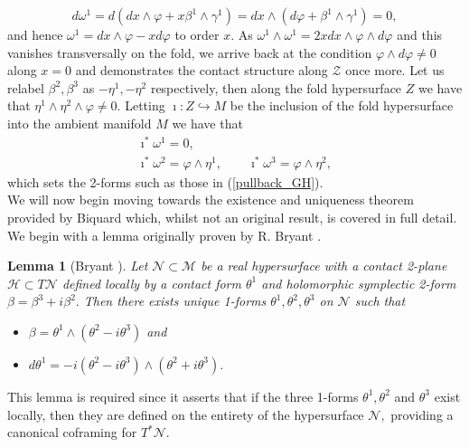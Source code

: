 \documentclass[a4paper,12pt, onecolumn, notitlepage]{article}
\newtheorem{lem}[thm]{Lemma}
\theoremstyle{definition}
\theoremstyle{remark}
\newcommand{\w}{\omega}
\newcommand{\vp}{\varphi}
\begin{document}
\begin{equation*}
	d\w^{1} = d(dx\wedge\varphi + x\beta^{1}\wedge\gamma^{1})
	= dx\wedge (d\varphi + \beta^{1}\wedge\gamma^{1})
	= 0,
\end{equation*}
and hence $\w^{1} = dx\wedge\varphi - xd\varphi$ to order $x.$ As $\w^{1}\wedge\w^{1} = 2xdx\wedge\varphi\wedge d\varphi$ and this vanishes transversally on the fold, we arrive back at the condition $\varphi\wedge d\varphi\neq 0$ along $x=0$ and demonstrates the contact structure along $\mathcal{Z}$ once more. Let us relabel $\beta^{2},\beta^{3}$ as $-\eta^{1}, -\eta^{2}$ respectively, then along the fold hypersurface $Z$ we have that $\eta^{1}\wedge\eta^{2}\wedge\vp\neq 0.$ Letting $\imath:Z\hookrightarrow M$ be the inclusion of the fold hypersurface into the ambient manifold $M$ we have that
\begin{subequations}
	\begin{gather*}
	\imath^{\ast}\w^{1} = 0,\\
	\label{k_pullbacks}
	\imath^{\ast}\w^{2} = \vp\wedge\eta^{1},\qquad \imath^{\ast}\w^{3} = \vp\wedge\eta^{2},
	\end{gather*}
\end{subequations}
which sets the 2-forms such as those in (\ref{pullback_GH}).\\
We will now begin moving towards the existence and uniqueness theorem provided by Biquard which, whilst not an original result, is covered in full detail. We begin with a lemma originally proven by R. Bryant \cite{bryant_2004}.\\

\begin{lem}[Bryant \cite{bryant_2004}]
	\label{bryant}
	Let $\mathcal{N}\subset\mathcal{M}$ be a real hypersurface with a contact 2-plane $\mathcal{H}\subset T\mathcal{N}$ defined locally by a contact form $\theta^{1}$ and holomorphic symplectic 2-form $\beta = \beta^{3} + i\beta^{2}.$ Then there exists unique 1-forms $\theta^{1},\theta^{2},\theta^{3}$ on $\mathcal{N}$ such that
	\begin{itemize}
		\item $\beta = \theta^{1}\wedge(\theta^{2}-i\theta^{3})$ and
		\item $d\theta^{1}=-i(\theta^{2}-i\theta^{3})\wedge (\theta^{2}+i\theta^{3}).$\\
	\end{itemize}
\end{lem}
This lemma is required since it asserts that if the three 1-forms $\theta^{1},\theta^{2}$ and $\theta^{3}$ exist locally, then they are defined on the entirety of the hypersurface $\mathcal{N},$ providing a canonical coframing for $T^{\ast}\mathcal{N}.$\\
\end{document}
